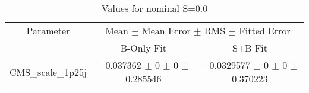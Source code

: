 \begin{table}
\centering
\caption{Values for nominal S=0.0}
\begin{tabular}{ccc}
\toprule
Parameter & \multicolumn{2}{c}{Mean $\pm$ Mean Error $\pm$ RMS $\pm$ Fitted Error}\\
 & B-Only Fit & S+B Fit\\
\midrule
CMS\_scale\_1p25j & \num{-0.037362} $\pm$ \num{0} $\pm$ \num{0} $\pm$ \num{0.285546} & \num{-0.0329577} $\pm$ \num{0} $\pm$ \num{0} $\pm$ \num{0.370223}\\
\bottomrule
\end{tabular}
\end{table}